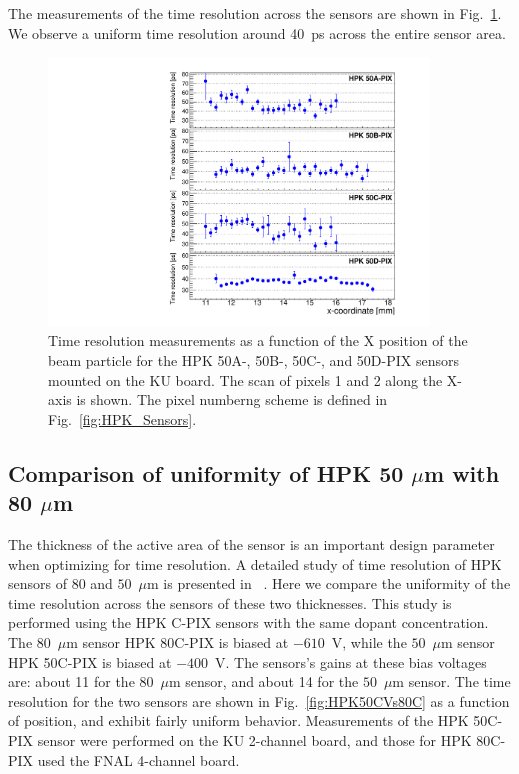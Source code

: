 \documentclass[preprint,1p]{elsarticle}
\begin{document}
The measurements of the time resolution across the sensors are shown in
Fig.~\ref{fig:KUBoard_50ABCD_TimeResolution}. We observe a uniform time
resolution around 40~ps across the entire sensor area. 


\begin{figure}[htbp] 
\centering
\includegraphics[width=0.9\textwidth]{figs/KUBoard_HPK50ABCD/KUBoard_50ABCD_TimeResolution.pdf} 
\caption{Time resolution measurements as a function of the X position of the beam particle
for the HPK 50A-, 50B-, 50C-, and 50D-PIX sensors mounted on the KU board. The scan of 
pixels 1 and 2 along the X-axis is shown. The pixel numberng scheme is 
defined in Fig.~\ref{fig:HPK_Sensors}.} 
\label{fig:KUBoard_50ABCD_TimeResolution} 
\end{figure} 


\subsection{Comparison of uniformity of HPK 50 $\mu$m with 80 $\mu$m}
\label{sec:HPK50vs80}

The thickness of the active area of the sensor is an important design parameter
when optimizing for time resolution. A detailed study of time resolution of HPK
sensors of 80 and $50$~$\mu$m is presented in ~\cite{Galloway:2017gfx}. Here we
compare the uniformity of the time resolution across the sensors of these two
thicknesses. This study is performed using the HPK C-PIX sensors with the same
dopant concentration. The $80$~$\mu$m sensor HPK 80C-PIX is biased at $-610$~V,
while the $50$~$\mu$m sensor HPK 50C-PIX is biased at $-400$~V. The sensors's
gains at these bias voltages are: about 11 for the $80$~$\mu$m sensor, and about
14 for the $50$~$\mu$m sensor. The time resolution for the two sensors are shown
in Fig.~\ref{fig:HPK50CVs80C} as a function of position, and exhibit fairly
uniform behavior. Measurements of the HPK 50C-PIX sensor were performed on the
KU 2-channel board, and those for HPK 80C-PIX used the FNAL 4-channel board. 
\end{document}
